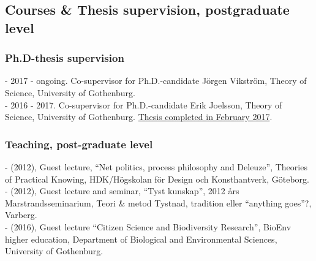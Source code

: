 \documentclass[a4paper,11pt,oneside]{article}
\begin{document}
    \subsection{Courses \& Thesis supervision, postgraduate level}

    \subsubsection{Ph.D-thesis supervision}
    - 2017 - ongoing. Co-supervisor for Ph.D.-candidate Jörgen Vikström, Theory of Science, University of Gothenburg.\\
    - 2016 - 2017. Co-supervisor for Ph.D.-candidate Erik Joelsson, Theory of Science, University of Gothenburg. \href{https://gupea.ub.gu.se/handle/2077/51493}{Thesis completed in February 2017}.

    \subsubsection{Teaching, post-graduate level}
    - (2012), Guest lecture, ``Net politics, process philosophy and Deleuze'', Theories of Practical Knowing, HDK/Högskolan för Design och Konsthantverk, Göteborg.\\
    - (2012), Guest lecture and seminar, ``Tyst kunskap'', 2012 års Marstrandsseminarium, Teori \& metod Tystnad, tradition eller ``anything goes''?, Varberg.\\
    - (2016), Guest lecture ``Citizen Science and Biodiversity Research'', BioEnv higher education, Department of Biological and Environmental Sciences, University of Gothenburg.\\




\end{document}
